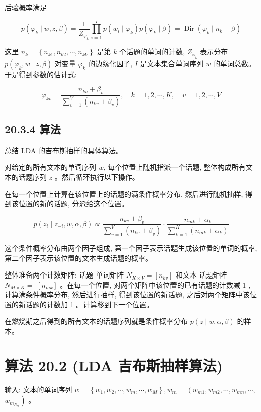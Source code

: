 \documentclass[10pt]{article}
\begin{document}
\begin{CJK*}{UTF8}{bsmi}
后验概率满足


\begin{equation*}
p\left(\varphi_{k} \mid w, z, \beta\right)=\frac{1}{Z_{\varphi_{k}}} \prod_{i=1}^{I} p\left(w_{i} \mid \varphi_{k}\right) p\left(\varphi_{k} \mid \beta\right)=\operatorname{Dir}\left(\varphi_{k} \mid n_{k}+\beta\right) \tag{20.32}
\end{equation*}


这里 $n_{k}=\left\{n_{k 1}, n_{k 2}, \cdots, n_{k V}\right\}$ 是第 $k$ 个话题的单词的计数, $Z_{\varphi_{k}}$ 表示分布 $p\left(\varphi_{k}, w \mid z, \beta\right)$ 对变量 $\varphi_{k}$ 的边缘化因子, $I$ 是文本集合单词序列 $w$ 的单词总数。于是得到参数的估计式:


\begin{equation*}
\varphi_{k v}=\frac{n_{k v}+\beta_{v}}{\sum_{v=1}^{V}\left(n_{k v}+\beta_{v}\right)}, \quad k=1,2, \cdots, K, \quad v=1,2, \cdots, V \tag{20.33}
\end{equation*}


\subsection*{20.3.4 算法}
总结 LDA 的吉布斯抽样的具体算法。

对给定的所有文本的单词序列 $w$, 每个位置上随机指派一个话题, 整体构成所有文本的话题序列 $z$ 。然后循环执行以下操作。

在每一个位置上计算在该位置上的话题的满条件概率分布, 然后进行随机抽样, 得到该位置的新的话题, 分派给这个位置。

$$
p\left(z_{i} \mid z_{-i}, w, \alpha, \beta\right) \propto \frac{n_{k v}+\beta_{v}}{\sum_{v=1}^{V}\left(n_{k v}+\beta_{v}\right)} \cdot \frac{n_{m k}+\alpha_{k}}{\sum_{k=1}^{K}\left(n_{m k}+\alpha_{k}\right)}
$$

这个条件概率分布由两个因子组成, 第一个因子表示话题生成该位置的单词的概率, 第二个因子表示该位置的文本生成话题的概率。

整体准备两个计数矩阵: 话题-单词矩阵 $N_{K \times V}=\left[n_{k v}\right]$ 和文本-话题矩阵 $N_{M \times K}=$ $\left[n_{m k}\right]$ 。在每一个位置, 对两个矩阵中该位置的已有话题的计数减 1 , 计算满条件概率分布, 然后进行抽样, 得到该位置的新话题, 之后对两个矩阵中该位置的新话题的计数加 1 。计算移到下一个位置。

在燃烧期之后得到的所有文本的话题序列就是条件概率分布 $p(z \mid w, \alpha, \beta)$ 的样本。

\section*{算法 20.2 (LDA 吉布斯抽样算法)}
输入: 文本的单词序列 $w=\left\{w_{1}, w_{2}, \cdots, w_{m}, \cdots, w_{M}\right\}, w_{m}=\left(w_{m 1}, w_{m 2}, \cdots, w_{m n}, \cdots\right.$, $\left.w_{m_{N_{m}}}\right)$ 。


\end{CJK*}
\end{document}
